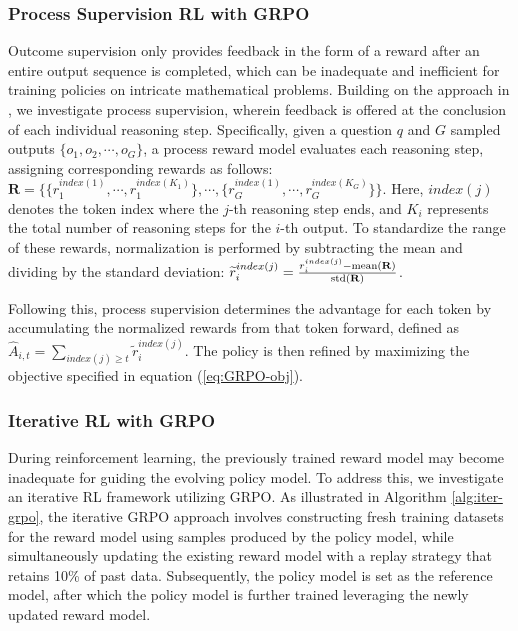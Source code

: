 \begin{itemize}[topsep=0pt]
\begin{itemize}[topsep=0pt]
\subsubsection{Process Supervision RL with GRPO} 

Outcome supervision only provides feedback in the form of a reward after an entire output sequence is completed, which can be inadequate and inefficient for training policies on intricate mathematical problems. Building on the approach in \cite{wang2023math}, we investigate process supervision, wherein feedback is offered at the conclusion of each individual reasoning step. Specifically, given a question $q$ and $G$ sampled outputs $\{o_1, o_2, \cdots, o_G\}$, a process reward model evaluates each reasoning step, assigning corresponding rewards as follows: $\mathbf{R} = \{ \{r_1^{index(1)},\cdots,r_1^{index(K_1)}\}, \cdots,  \{r_G^{index(1)},\cdots,r_G^{index(K_G)}\} \}$. Here, $index(j)$ denotes the token index where the $j$-th reasoning step ends, and $K_i$ represents the total number of reasoning steps for the $i$-th output. To standardize the range of these rewards, normalization is performed by subtracting the mean and dividing by the standard deviation: $\widetilde{r}_i^{index(j)} = \frac{r_i^{index(j)} - {\rm mean(\mathbf{R})}}{{\rm std(\mathbf{R})}}$.

Following this, process supervision determines the advantage for each token by accumulating the normalized rewards from that token forward, defined as $\hat{A}_{i, t} = \sum_{index(j) \ge t} \widetilde{r}_i^{index(j)}$. The policy is then refined by maximizing the objective specified in equation (\ref{eq:GRPO-obj}).

\subsubsection{Iterative RL with GRPO} During reinforcement learning, the previously trained reward model may become inadequate for guiding the evolving policy model. To address this, we investigate an iterative RL framework utilizing GRPO. As illustrated in Algorithm \ref{alg:iter-grpo}, the iterative GRPO approach involves constructing fresh training datasets for the reward model using samples produced by the policy model, while simultaneously updating the existing reward model with a replay strategy that retains 10\% of past data. Subsequently, the policy model is set as the reference model, after which the policy model is further trained leveraging the newly updated reward model.


\end{itemize}
\end{itemize}
